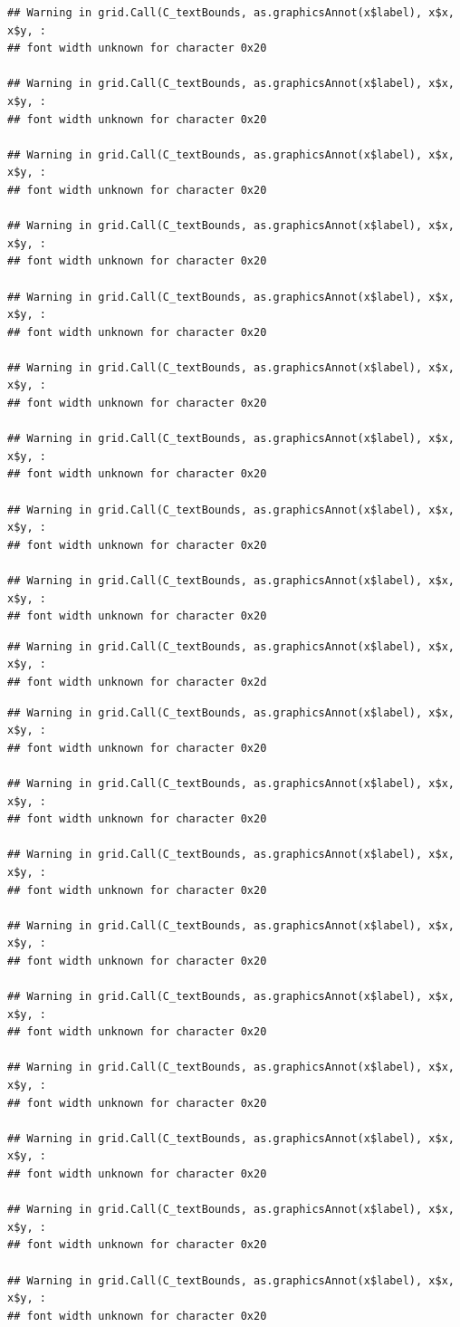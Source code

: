 \documentclass[]{article}
\theoremstyle{definition}
\theoremstyle{definition}
\theoremstyle{definition}
\theoremstyle{remark}
\begin{document}
\begin{verbatim}
## Warning in grid.Call(C_textBounds, as.graphicsAnnot(x$label), x$x, x$y, :
## font width unknown for character 0x20

## Warning in grid.Call(C_textBounds, as.graphicsAnnot(x$label), x$x, x$y, :
## font width unknown for character 0x20

## Warning in grid.Call(C_textBounds, as.graphicsAnnot(x$label), x$x, x$y, :
## font width unknown for character 0x20

## Warning in grid.Call(C_textBounds, as.graphicsAnnot(x$label), x$x, x$y, :
## font width unknown for character 0x20

## Warning in grid.Call(C_textBounds, as.graphicsAnnot(x$label), x$x, x$y, :
## font width unknown for character 0x20

## Warning in grid.Call(C_textBounds, as.graphicsAnnot(x$label), x$x, x$y, :
## font width unknown for character 0x20

## Warning in grid.Call(C_textBounds, as.graphicsAnnot(x$label), x$x, x$y, :
## font width unknown for character 0x20

## Warning in grid.Call(C_textBounds, as.graphicsAnnot(x$label), x$x, x$y, :
## font width unknown for character 0x20

## Warning in grid.Call(C_textBounds, as.graphicsAnnot(x$label), x$x, x$y, :
## font width unknown for character 0x20
\end{verbatim}

\begin{verbatim}
## Warning in grid.Call(C_textBounds, as.graphicsAnnot(x$label), x$x, x$y, :
## font width unknown for character 0x2d
\end{verbatim}

\begin{verbatim}
## Warning in grid.Call(C_textBounds, as.graphicsAnnot(x$label), x$x, x$y, :
## font width unknown for character 0x20

## Warning in grid.Call(C_textBounds, as.graphicsAnnot(x$label), x$x, x$y, :
## font width unknown for character 0x20

## Warning in grid.Call(C_textBounds, as.graphicsAnnot(x$label), x$x, x$y, :
## font width unknown for character 0x20

## Warning in grid.Call(C_textBounds, as.graphicsAnnot(x$label), x$x, x$y, :
## font width unknown for character 0x20

## Warning in grid.Call(C_textBounds, as.graphicsAnnot(x$label), x$x, x$y, :
## font width unknown for character 0x20

## Warning in grid.Call(C_textBounds, as.graphicsAnnot(x$label), x$x, x$y, :
## font width unknown for character 0x20

## Warning in grid.Call(C_textBounds, as.graphicsAnnot(x$label), x$x, x$y, :
## font width unknown for character 0x20

## Warning in grid.Call(C_textBounds, as.graphicsAnnot(x$label), x$x, x$y, :
## font width unknown for character 0x20

## Warning in grid.Call(C_textBounds, as.graphicsAnnot(x$label), x$x, x$y, :
## font width unknown for character 0x20
\end{verbatim}
\end{document}
